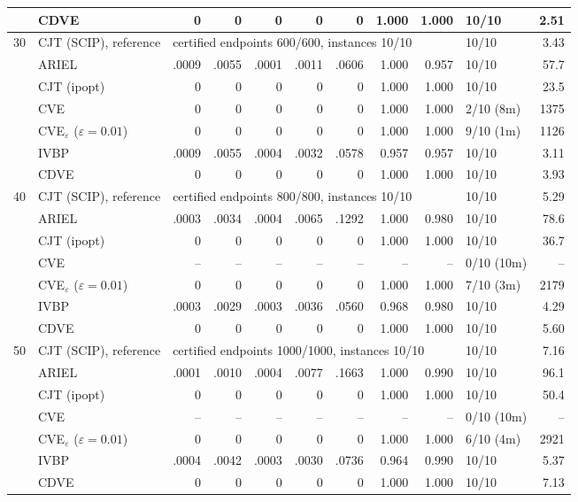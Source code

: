\begin{table}[htbp]
\begin{tabular}{rlrrrrrrrlr}
 & CDVE & 0 & 0 & 0 & 0 & 0 & 1.000 & 1.000 & 10/10 & 2.51 \\
\midrule
30 & CJT (SCIP), reference & \multicolumn{7}{l}{certified endpoints 600/600, instances 10/10} & 10/10 & 3.43 \\
 & ARIEL & .0009 & .0055 & .0001 & .0011 & .0606 & 1.000 & 0.957 & 10/10 & 57.7 \\
 & CJT (ipopt) & 0 & 0 & 0 & 0 & 0 & 1.000 & 1.000 & 10/10 & 23.5 \\
 & CVE & 0 & 0 & 0 & 0 & 0 & 1.000 & 1.000 & 2/10 (8m) & 1375 \\
 & CVE$_\varepsilon$ ($\varepsilon{=}0.01$) & 0 & 0 & 0 & 0 & 0 & 1.000 & 1.000 & 9/10 (1m) & 1126 \\
 & IVBP & .0009 & .0055 & .0004 & .0032 & .0578 & 0.957 & 0.957 & 10/10 & 3.11 \\
 & CDVE & 0 & 0 & 0 & 0 & 0 & 1.000 & 1.000 & 10/10 & 3.93 \\
\midrule
40 & CJT (SCIP), reference & \multicolumn{7}{l}{certified endpoints 800/800, instances 10/10} & 10/10 & 5.29 \\
 & ARIEL & .0003 & .0034 & .0004 & .0065 & .1292 & 1.000 & 0.980 & 10/10 & 78.6 \\
 & CJT (ipopt) & 0 & 0 & 0 & 0 & 0 & 1.000 & 1.000 & 10/10 & 36.7 \\
 & CVE & -- & -- & -- & -- & -- & -- & -- & 0/10 (10m) & -- \\
 & CVE$_\varepsilon$ ($\varepsilon{=}0.01$) & 0 & 0 & 0 & 0 & 0 & 1.000 & 1.000 & 7/10 (3m) & 2179 \\
 & IVBP & .0003 & .0029 & .0003 & .0036 & .0560 & 0.968 & 0.980 & 10/10 & 4.29 \\
 & CDVE & 0 & 0 & 0 & 0 & 0 & 1.000 & 1.000 & 10/10 & 5.60 \\
\midrule
50 & CJT (SCIP), reference & \multicolumn{7}{l}{certified endpoints 1000/1000, instances 10/10} & 10/10 & 7.16 \\
 & ARIEL & .0001 & .0010 & .0004 & .0077 & .1663 & 1.000 & 0.990 & 10/10 & 96.1 \\
 & CJT (ipopt) & 0 & 0 & 0 & 0 & 0 & 1.000 & 1.000 & 10/10 & 50.4 \\
 & CVE & -- & -- & -- & -- & -- & -- & -- & 0/10 (10m) & -- \\
 & CVE$_\varepsilon$ ($\varepsilon{=}0.01$) & 0 & 0 & 0 & 0 & 0 & 1.000 & 1.000 & 6/10 (4m) & 2921 \\
 & IVBP & .0004 & .0042 & .0003 & .0030 & .0736 & 0.964 & 0.990 & 10/10 & 5.37 \\
 & CDVE & 0 & 0 & 0 & 0 & 0 & 1.000 & 1.000 & 10/10 & 7.13 \\

\end{tabular}
\end{table}
